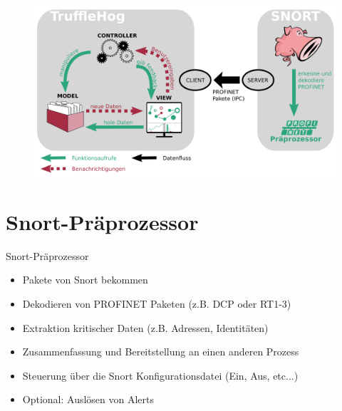 \documentclass[18pt]{beamer}
\begin{document}
\begin{frame}
    \begin{figure}
    	\centering
    	\includegraphics[width=\textwidth]{./images/jan_12.png}
    \end{figure}
\end{frame}


\section{Snort-Präprozessor}
\begin{frame}{Snort-Präprozessor}
    \begin{itemize}
      \item Pakete von Snort bekommen
      \pause
      \item Dekodieren von PROFINET Paketen (z.B. DCP oder RT1-3)
      \pause
      \item Extraktion kritischer Daten (z.B. Adressen, Identitäten)
      \pause
      \item Zusammenfassung und Bereitstellung an einen anderen Prozess
      \pause
      \item Steuerung über die Snort Konfigurationsdatei (Ein, Aus, etc...)
      \pause
      \item Optional: Auslösen von Alerts
    \end{itemize}
\end{frame}
\end{document}
